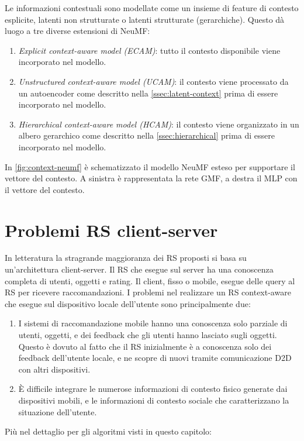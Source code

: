 Le informazioni contestuali sono modellate come un insieme di feature di contesto esplicite, latenti non strutturate o latenti strutturate (gerarchiche). Questo dà luogo a tre diverse estensioni di NeuMF:
\begin{enumerate}
 \item \textit{Explicit context-aware model (ECAM)}: tutto il contesto disponibile viene incorporato nel modello.
 \item \textit{Unstructured context-aware model (UCAM)}: il contesto viene processato da un autoencoder \cite{latent-context} come descritto nella \autoref{ssec:latent-context} prima di essere incorporato nel modello.
 \item \textit{Hierarchical context-aware model (HCAM)}: il contesto viene organizzato in un albero gerarchico \cite{hierarchical-context} come descritto nella \autoref{ssec:hierarchical} prima di essere incorporato nel modello.
\end{enumerate}
In \autoref{fig:context-neumf} è schematizzato il modello NeuMF  esteso per supportare il vettore del contesto. A sinistra è rappresentata la rete GMF, a destra il MLP con il vettore del contesto.


\section{Problemi RS client-server}
In letteratura la stragrande maggioranza dei RS proposti si basa su un'architettura client-server. Il RS che esegue sul server ha una conoscenza completa di utenti, oggetti e rating. Il client, fisso o mobile, esegue delle query al RS per ricevere raccomandazioni. I problemi nel realizzare un RS context-aware che esegue sul dispositivo locale dell'utente sono principalmente due:
\begin{enumerate}
 \item I sistemi di raccomandazione mobile hanno una conoscenza solo parziale di utenti, oggetti, e dei feedback che gli utenti hanno lasciato sugli oggetti. Questo è dovuto al fatto che il RS inizialmente è a conoscenza solo dei feedback dell'utente locale, e ne scopre di nuovi tramite comunicazione D2D con altri dispositivi. 
 
 \item \`E difficile integrare le numerose informazioni di contesto fisico generate dai dispositivi mobili, e le informazioni di contesto sociale che caratterizzano la situazione dell'utente.
\end{enumerate}
Più nel dettaglio per gli algoritmi visti in questo capitolo:


